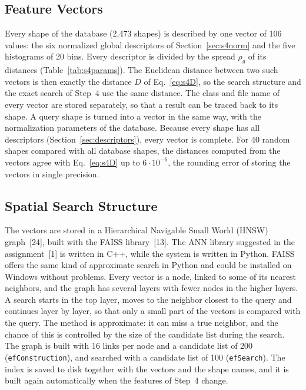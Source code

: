 \documentclass[10pt,a4paper]{article}
\begin{document}
\subsection{Feature Vectors}\label{sec:s5vectors}
Every shape of the database (2,473 shapes) is described by one vector of 106 values: the six normalized global descriptors of
Section~\ref{sec:s4norm} and the five histograms of 20 bins. Every descriptor is divided by the spread $\rho_g$ of its distances
(Table~\ref{tab:s4params}). The Euclidean distance between two such vectors is then exactly the distance $D$ of
Eq.~\eqref{eq:s4D}, so the search structure and the exact search of Step~4 use the same distance. The class and file name of
every vector are stored separately, so that a result can be traced back to its shape. A query shape is turned into a vector in
the same way, with the normalization parameters of the database. Because every shape has all descriptors
(Section~\ref{sec:descriptors}), every vector is complete. For 40 random shapes compared with all database shapes, the distances
computed from the vectors agree with Eq.~\eqref{eq:s4D} up to $6\cdot10^{-6}$, the rounding error of storing the vectors in single
precision.

\subsection{Spatial Search Structure}\label{sec:s5search}
The vectors are stored in a Hierarchical Navigable Small World (HNSW) graph~[24], built with the FAISS library~[13]. The ANN
library suggested in the assignment~[1] is written in C++, while the system is written in Python. FAISS offers the same kind of
approximate search in Python and could be installed on Windows without problems. Every
vector is a node, linked to some of its nearest neighbors, and the graph has several layers with fewer nodes in the higher
layers. A search starts in the top layer, moves to the neighbor closest to the query and continues layer by layer, so that only
a small part of the vectors is compared with the query. The method is approximate: it can miss a true neighbor, and the chance
of this is controlled by the size of the candidate list during the search. The graph is built with 16 links per node and a
candidate list of 200 (\texttt{efConstruction}), and searched with a candidate list of 100 (\texttt{efSearch}). The index is saved
to disk together with the vectors and the shape names, and it is built again automatically when the features of Step~4 change.
\end{document}
